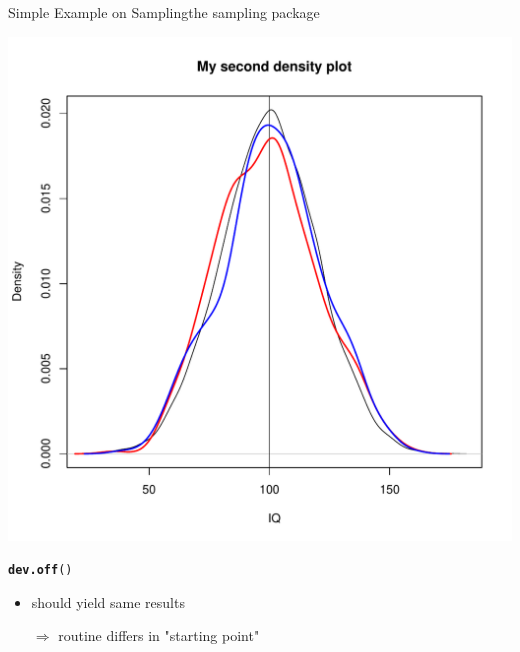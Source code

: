 \documentclass[11pt,german,hideothersubsections]{beamer}\usepackage[]{graphicx}\usepackage[]{color}
\makeatletter
\def\maxwidth{ %
  \ifdim\Gin@nat@width>\linewidth
    \linewidth
  \else
    \Gin@nat@width
  \fi
}
\newcommand{\hlstd}[1]{\textcolor[rgb]{0.345,0.345,0.345}{#1}}%
\newcommand{\hlkwd}[1]{\textcolor[rgb]{0.737,0.353,0.396}{\textbf{#1}}}%
\newenvironment{kframe}{%
 \def\at@end@of@kframe{}%
 \ifinner\ifhmode%
  \def\at@end@of@kframe{\end{minipage}}%
  \begin{minipage}{\columnwidth}%
 \fi\fi%
 \def\FrameCommand##1{\hskip\@totalleftmargin \hskip-\fboxsep
 \colorbox{shadecolor}{##1}\hskip-\fboxsep
     \hskip-\linewidth \hskip-\@totalleftmargin \hskip\columnwidth}%
 \MakeFramed {\advance\hsize-\width
   \@totalleftmargin\z@ \linewidth\hsize
   \@setminipage}}%
 {\par\unskip\endMakeFramed%
 \at@end@of@kframe}
\newenvironment{knitrout}{}{} %
\makeatother
\begin{document}
\begin{frame}[fragile]{Simple Example on Sampling}{the sampling package}
\begin{minipage}{5.5cm}
\begin{knitrout}
\includegraphics[width=\maxwidth]{figure/unnamed-chunk-17-2} 

\end{knitrout}
\end{minipage}
\begin{knitrout}
\color{fgcolor}\begin{kframe}
\begin{alltt}
\hlkwd{dev.off}\hlstd{()}
\end{alltt}
\end{kframe}
\end{knitrout}
\begin{itemize}
\pause\item should yield same results
\item[$\Rightarrow$] routine differs in "starting point"
\end{itemize}
\end{frame}
\end{document}
